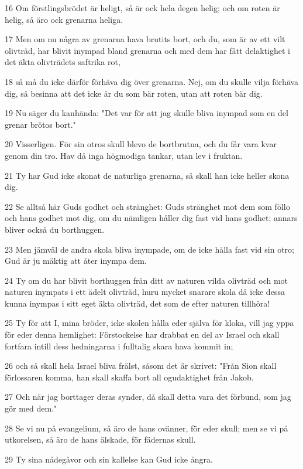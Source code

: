 \par 16 Om förstlingsbrödet är heligt, så är ock hela degen helig; och om roten är helig, så äro ock grenarna heliga.
\par 17 Men om nu några av grenarna hava brutits bort, och du, som är av ett vilt olivträd, har blivit inympad bland grenarna och med dem har fått delaktighet i det äkta olivträdets saftrika rot,
\par 18 så må du icke därför förhäva dig över grenarna. Nej, om du skulle vilja förhäva dig, så besinna att det icke är du som bär roten, utan att roten bär dig.
\par 19 Nu säger du kanhända: "Det var för att jag skulle bliva inympad som en del grenar brötos bort."
\par 20 Visserligen. För sin otros skull blevo de bortbrutna, och du får vara kvar genom din tro. Hav då inga högmodiga tankar, utan lev i fruktan.
\par 21 Ty har Gud icke skonat de naturliga grenarna, så skall han icke heller skona dig.
\par 22 Se alltså här Guds godhet och stränghet: Guds stränghet mot dem som föllo och hans godhet mot dig, om du nämligen håller dig fast vid hans godhet; annars bliver också du borthuggen.
\par 23 Men jämväl de andra skola bliva inympade, om de icke hålla fast vid sin otro; Gud är ju mäktig att åter inympa dem.
\par 24 Ty om du har blivit borthuggen från ditt av naturen vilda olivträd och mot naturen inympats i ett ädelt olivträd, huru mycket snarare skola då icke dessa kunna inympas i sitt eget äkta olivträd, det som de efter naturen tillhöra!
\par 25 Ty för att I, mina bröder, icke skolen hålla eder själva för kloka, vill jag yppa för eder denna hemlighet: Förstockelse har drabbat en del av Israel och skall fortfara intill dess hedningarna i fulltalig skara hava kommit in;
\par 26 och så skall hela Israel bliva frälst, såsom det är skrivet: "Från Sion skall förlossaren komma, han skall skaffa bort all ogudaktighet från Jakob.
\par 27 Och när jag borttager deras synder, då skall detta vara det förbund, som jag gör med dem."
\par 28 Se vi nu på evangelium, så äro de hans ovänner, för eder skull; men se vi på utkorelsen, så äro de hans älskade, för fädernas skull.
\par 29 Ty sina nådegåvor och sin kallelse kan Gud icke ångra.
